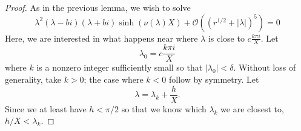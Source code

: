 \documentclass[thesis.tex]{subfiles}
\begin{document}
\begin{lemma}
\begin{proof}
As in the previous lemma, we wish to solve
\begin{equation*}
\lambda^2 ( \lambda - b i) (\lambda + b i)\sinh(\nu(\lambda)X) + \mathcal{O}( (r^{1/2} + |\lambda|)^5 ) = 0
\end{equation*}
Here, we are interested in what happens near where $\lambda$ is close to $c \frac{k \pi i}{X}$. Let 
\[
\lambda_0 = c \frac{k \pi i}{X}
\]
where $k$ is a nonzero integer sufficiently small so that $|\lambda_0| < \delta$. Without loss of generality, take $k > 0$; the case where $k < 0$ follow by symmetry. Let
\[
\lambda = \lambda_k + \frac{h}{X}.
\]
Since we at least have $h < \pi/2$ so that we know which $\lambda_k$ we are closest to, $h/X < \lambda_k$.


\end{proof}
\end{lemma}
\end{document}
